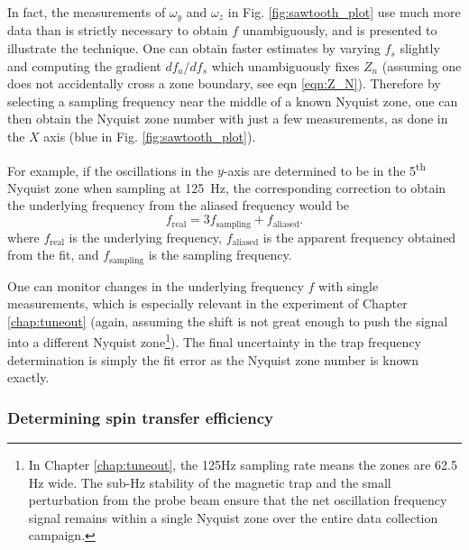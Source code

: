 	In fact, the measurements of $\omega_y$ and $\omega_z$ in Fig. \ref{fig:sawtooth_plot} use much more data than is strictly necessary to obtain $f$ unambiguously, and is presented to illustrate the technique. 
	One can obtain faster estimates by varying $f_s$ slightly and computing the gradient $df_a/df_s$ which unambiguously fixes $Z_n$ (assuming one does not accidentally cross a zone boundary, see eqn \ref{eqn:Z_N}).
	Therefore by selecting a sampling frequency near the middle of a known Nyquist zone, one can then obtain the Nyquist zone number with just a few measurements, as done in the $X$ axis (blue in Fig. \ref{fig:sawtooth_plot}). 
	
	For example, if the oscillations in the \(y\)-axis are determined to be in the 5\textsuperscript{th} Nyquist zone when sampling at 125~Hz, the corresponding correction to obtain the underlying frequency from the aliased frequency would be
	\begin{equation}
	    f_{\text{real}}=3 f_{\text{sampling}} + f_{\text{aliased}}.
	\end{equation}
	where \(f_{\text{real}}\) is the underlying frequency, \(f_{\text{aliased}}\) is the apparent frequency obtained from the fit, and \(f_{\text{sampling}}\) is the sampling frequency. 

	One can monitor changes in the underlying frequency $f$ with single measurements, which is especially relevant in the experiment of Chapter \ref{chap:tuneout} (again, assuming the shift is not great enough to push the signal into a different Nyquist zone\footnote{In Chapter \ref{chap:tuneout}, the 125Hz sampling rate means the zones are 62.5 Hz wide. The sub-Hz stability of the magnetic trap and the small perturbation from the probe beam ensure that the net oscillation frequency signal remains within a single Nyquist zone over the entire data collection campaign. }).	
	The final uncertainty in the trap frequency determination is simply the fit error as the Nyquist zone number is known exactly.


\subsubsection{Determining spin transfer efficiency}
\label{sec:th_spin}

